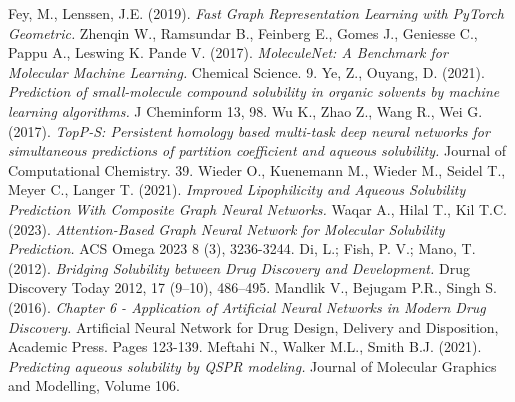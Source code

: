 \documentclass[a4paper,14pt]{article}
\begin{document}
\begin{thebibliography}{25}
Fey, M., Lenssen, J.E. (2019). \emph{Fast Graph Representation Learning with PyTorch Geometric.}
Zhenqin W., Ramsundar B., Feinberg E., Gomes J., Geniesse C., Pappu A., Leswing K. Pande V. (2017). \emph{MoleculeNet: A Benchmark for Molecular Machine Learning.} Chemical Science. 9.
Ye, Z., Ouyang, D. (2021). \emph{Prediction of small-molecule compound solubility in organic solvents by machine learning algorithms.} J Cheminform 13, 98.
Wu K., Zhao Z., Wang R., Wei G. (2017). \emph{TopP-S: Persistent homology based multi-task deep neural networks for simultaneous predictions of partition coefficient and aqueous solubility.} Journal of Computational Chemistry. 39.
Wieder O., Kuenemann M., Wieder M., Seidel T., Meyer C., Langer T. (2021). \emph{Improved Lipophilicity and Aqueous Solubility Prediction With Composite Graph Neural Networks.} 
Waqar A., Hilal T., Kil T.C. (2023). \emph{Attention-Based Graph Neural Network for Molecular Solubility Prediction.} ACS Omega 2023 8 (3), 3236-3244.
Di, L.; Fish, P. V.; Mano, T. (2012). \emph{Bridging Solubility between Drug Discovery and Development.} Drug Discovery Today 2012, 17 (9–10), 486–495.
Mandlik V., Bejugam P.R., Singh S. (2016). \emph{Chapter 6 - Application of Artificial Neural Networks in Modern Drug Discovery.} Artificial Neural Network for Drug Design, Delivery and Disposition, Academic Press. Pages 123-139.
Meftahi N., Walker M.L., Smith B.J. (2021). \emph{Predicting aqueous solubility by QSPR modeling.} Journal of Molecular Graphics and Modelling, Volume 106.

\end{thebibliography}
\end{document}
